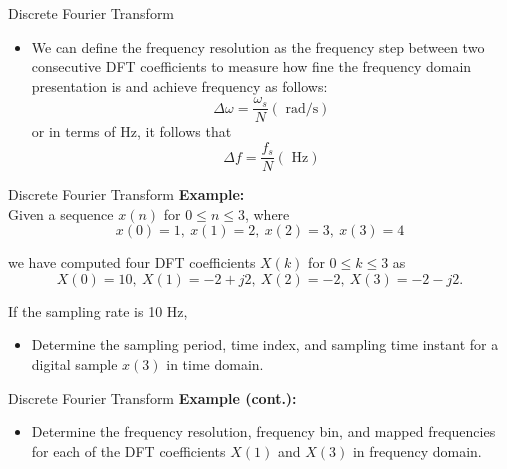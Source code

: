 \documentclass[pdflatex,compress,mathserif]{beamer}
\begin{document}
\begin{frame}{Discrete Fourier Transform}
    \begin{itemize}
        \item We can define the frequency resolution as the frequency step between two consecutive DFT coefficients to measure how fine the frequency domain presentation is and achieve frequency as follows:
        \begin{equation}
            \Delta \omega = \frac{\omega_s}{N} (\text{ rad/s})
        \end{equation}
        or in terms of Hz, it follows that
        \begin{equation}
            \Delta f = \frac{f_s}{N} (\text{ Hz})
        \end{equation}
    \end{itemize}
\end{frame}

\begin{frame}{Discrete Fourier Transform}
    \textbf{Example:}\\
    
    Given a sequence $x(n)$ for $0 \leq n \leq 3$, where 
    \begin{equation*}
        x(0) = 1,~x(1) = 2,~x(2) = 3,~x(3) = 4
    \end{equation*}
    
    we have computed four DFT coefficients $X(k)$ for $0 \leq k \leq 3$ as
    \begin{equation*}
        X(0) = 10,~X(1) = -2 + j2,~X(2) = -2,~X(3) = -2 - j2.
    \end{equation*}
    
    If the sampling rate is 10 Hz,
    
    \begin{itemize}
        \item Determine the sampling period, time index, and sampling time instant for a digital sample $x(3)$ in time domain.
    \end{itemize}
\end{frame}

\begin{frame}{Discrete Fourier Transform}
    \textbf{Example (cont.):}\\   
    \begin{itemize}
        \item Determine the frequency resolution, frequency bin, and mapped frequencies for each of the DFT coefficients $X(1)$ and $X(3)$ in frequency domain. 
    \end{itemize}
\end{frame}
\end{document}
